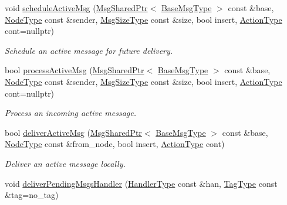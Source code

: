 \begin{DoxyCompactItemize}
void \hyperlink{structvt_1_1messaging_1_1_active_messenger_a877d3a681b48e386a1fe67201181b6bd}{schedule\+Active\+Msg} (\hyperlink{structvt_1_1messaging_1_1_msg_shared_ptr}{Msg\+Shared\+Ptr}$<$ \hyperlink{namespacevt_a44d0d4e144748f2b19a1cfd962f50338}{Base\+Msg\+Type} $>$ const \&base, \hyperlink{namespacevt_a866da9d0efc19c0a1ce79e9e492f47e2}{Node\+Type} const \&sender, \hyperlink{namespacevt_abfa009d900299ac1df967b40ea8f2c8a}{Msg\+Size\+Type} const \&size, bool insert, \hyperlink{namespacevt_ae0a5a7b18cc99d7b732cb4d44f46b0f3}{Action\+Type} cont=nullptr)
\begin{DoxyCompactList}\small\item\em Schedule an active message for future delivery. \end{DoxyCompactList}\item 
bool \hyperlink{structvt_1_1messaging_1_1_active_messenger_acfbb060ad1d13a75d2a061cfde137194}{process\+Active\+Msg} (\hyperlink{structvt_1_1messaging_1_1_msg_shared_ptr}{Msg\+Shared\+Ptr}$<$ \hyperlink{namespacevt_a44d0d4e144748f2b19a1cfd962f50338}{Base\+Msg\+Type} $>$ const \&base, \hyperlink{namespacevt_a866da9d0efc19c0a1ce79e9e492f47e2}{Node\+Type} const \&sender, \hyperlink{namespacevt_abfa009d900299ac1df967b40ea8f2c8a}{Msg\+Size\+Type} const \&size, bool insert, \hyperlink{namespacevt_ae0a5a7b18cc99d7b732cb4d44f46b0f3}{Action\+Type} cont=nullptr)
\begin{DoxyCompactList}\small\item\em Process an incoming active message. \end{DoxyCompactList}\item 
bool \hyperlink{structvt_1_1messaging_1_1_active_messenger_ae68f0233a6d4e95d339ba6c31697dfd5}{deliver\+Active\+Msg} (\hyperlink{structvt_1_1messaging_1_1_msg_shared_ptr}{Msg\+Shared\+Ptr}$<$ \hyperlink{namespacevt_a44d0d4e144748f2b19a1cfd962f50338}{Base\+Msg\+Type} $>$ const \&base, \hyperlink{namespacevt_a866da9d0efc19c0a1ce79e9e492f47e2}{Node\+Type} const \&from\+\_\+node, bool insert, \hyperlink{namespacevt_ae0a5a7b18cc99d7b732cb4d44f46b0f3}{Action\+Type} cont)
\begin{DoxyCompactList}\small\item\em Deliver an active message locally. \end{DoxyCompactList}\item 
void \hyperlink{structvt_1_1messaging_1_1_active_messenger_a0119aa4565a2268b55cd836b753c2afd}{deliver\+Pending\+Msgs\+Handler} (\hyperlink{namespacevt_af64846b57dfcaf104da3ef6967917573}{Handler\+Type} const \&han, \hyperlink{namespacevt_a84ab281dae04a52a4b243d6bf62d0e52}{Tag\+Type} const \&tag=no\+\_\+tag)

\end{DoxyCompactItemize}

